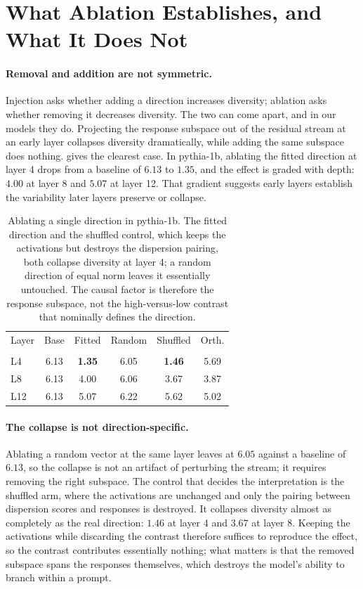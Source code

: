 \section{What Ablation Establishes, and What It Does Not}
\label{sec:mechanism}

\paragraph{Removal and addition are not symmetric.}
Injection asks whether adding a direction increases diversity; ablation asks whether removing it
decreases diversity. The two can come apart, and in our models they do. Projecting the response
subspace out of the residual stream at an early layer collapses diversity dramatically, while
adding the same subspace does nothing.  gives the clearest case. In pythia-1b,
ablating the fitted direction at layer 4 drops \vendi{} from a baseline of $6.13$ to $1.35$, and the
effect is graded with depth: $4.00$ at layer 8 and $5.07$ at layer 12. That gradient suggests early layers establish the variability
later layers preserve or collapse.

\begin{table}[t]
\centering
\footnotesize
\setlength{\tabcolsep}{3.5pt}
\begin{tabular}{lccccc}
\toprule
Layer & Base & Fitted & Random & Shuffled & Orth.\\ \\
\midrule
L4  & 6.13 & \textbf{1.35} & 6.05 & \textbf{1.46} & 5.69 \\
L8  & 6.13 & 4.00 & 6.06 & 3.67 & 3.87 \\
L12 & 6.13 & 5.07 & 6.22 & 5.62 & 5.02 \\
\bottomrule
\end{tabular}
\caption{Ablating a single direction in pythia-1b. The fitted direction and the shuffled control,
which keeps the activations but destroys the dispersion pairing, both collapse diversity at layer 4;
a random direction of equal norm leaves it essentially untouched. The causal factor is therefore the
response subspace, not the high-versus-low contrast that nominally defines the direction.}
\label{tab:ablation}
\end{table}

\paragraph{The collapse is not direction-specific.}
Ablating a random vector at the same layer leaves \vendi{} at $6.05$ against a baseline of $6.13$,
so the collapse is not an artifact of perturbing the stream; it requires removing the right subspace.
The control that decides the interpretation is the shuffled arm, where the activations are unchanged
and only the pairing between dispersion scores and responses is destroyed. It collapses diversity
almost as completely as the real direction: $1.46$ at layer 4 and $3.67$ at layer 8. Keeping the
activations while discarding the contrast therefore suffices to reproduce the effect, so the
contrast contributes essentially nothing; what matters is that the removed subspace spans the
responses themselves, which destroys the model's ability to branch within a prompt.


